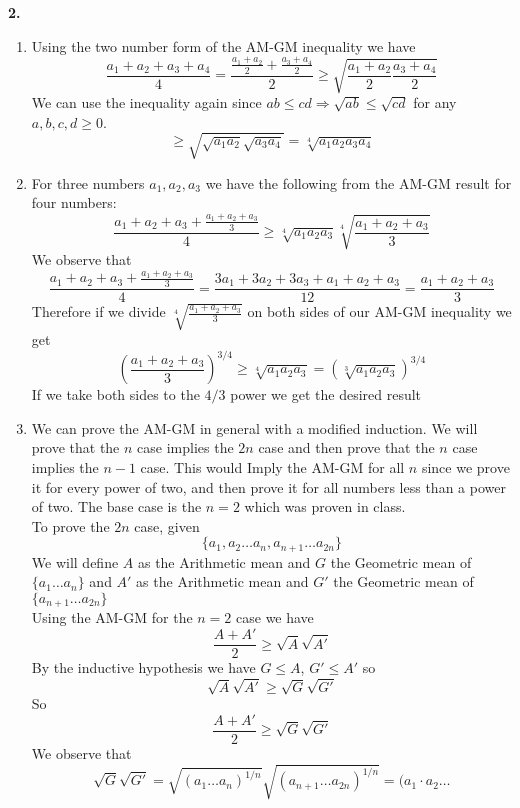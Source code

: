 \documentclass[12pt]{article}
\newenvironment{ques}{\vspace{2 ex}}{\vspace{2 ex}}
\theoremstyle{definition}
\begin{document}
\begin{ques}
	\textbf{2.} 
		\begin{enumerate}
			\item 
				Using the two number form of the AM-GM inequality we have
				$$\frac{a_1 + a_2 + a_3 + a_4}{4} =
				\frac{\frac{a_1 + a_2}2 + \frac{a_3 + a_4}
				2}{2} \geq \sqrt{\frac{a_1 + a_2}2 \frac{a_3 +
				a_4} 2}$$
				We can use the inequality again since $ab \leq
				cd \Rightarrow \sqrt{ab} \leq \sqrt{cd}$ for
				any $a, b, c, d \geq 0$. 
				$$\geq \sqrt{\sqrt{a_1a_2} \sqrt{a_3 a_4}} =
				\sqrt[4]{a_1a_2a_3a_4}$$
			\item 
				For three numbers $a_1, a_2, a_3$ we have the
				following from the AM-GM result for four
				numbers:
				$$\frac{a_1 + a_2 + a_3 + \frac{a_1 + a_2 +
				a_3}{3}}{4} \geq \sqrt[4]{a_1a_2a_3}\sqrt[4]
				{\frac{a_1 + a_2 + a_3}{3}}$$
				We observe that
				$$\frac{a_1 + a_2 + a_3 + \frac{a_1 + a_2 +
				a_3}{3}}{4} = \frac{3a_1 + 3a_2 + 3a_3 + a_1 +
				a_2 + a_3}{12} = \frac{a_1 + a_2 + a_3}{3}$$
				Therefore if we divide $\sqrt[4] {\frac{a_1 +
				a_2 + a_3}{3}}$ on both sides of our AM-GM
				inequality we get
				$$\left(\frac{a_1 + a_2 + a_3}{3}\right)^{3/4} \geq
				\sqrt[4]{a_1a_2a_3} = \left(\sqrt[3]{a_1a_2a_3}\right)^{3/4}$$
				If we take both sides to the $4/3$ power we get
				the desired result
			\item
				We can prove the AM-GM in general with a
				modified induction. We will prove that the $n$
				case implies the $2n$ case and then prove that
				the $n$ case implies the $n-1$ case. This would
				Imply the AM-GM for all $n$ since we prove it
				for every power of two, and then prove it for
				all numbers less than a power of two. The base
				case is the $n= 2$ which was proven in class.\\
				To prove the $2n$ case, given 
				$$\{a_1, a_2 \dots a_n, a_{n+1} \dots a_{2n}\}$$
				We will define $A$ as the Arithmetic mean and
				$G$ the Geometric mean of $\{a_1 \dots a_n\}$
				and $A'$ as the Arithmetic mean and $G'$ the
				Geometric mean  of $\{a_{n+1} \dots a_{2n}\}$\\
				Using the AM-GM for the $n = 2$ case we have
				$$\frac{A + A'}{2} \geq \sqrt{A}\sqrt{A'}$$
				By the inductive hypothesis we have $G \leq A$,
				$G' \leq A'$ so
				$$\sqrt{A}\sqrt{A'} \geq \sqrt{G}\sqrt{G'}$$
				So
				$$\frac{A + A'}{2} \geq \sqrt{G}\sqrt{G'}$$
				We observe that
				$$\sqrt{G}\sqrt{G'} = \sqrt{(a_1 \dots
				a_n)^{1/n}}\sqrt{(a_{n + 1} \dots
				a_{2n})^{1/n}} = (a_1 \cdot a_2 \dots
$$
\end{enumerate}
\end{ques}
\end{document}
